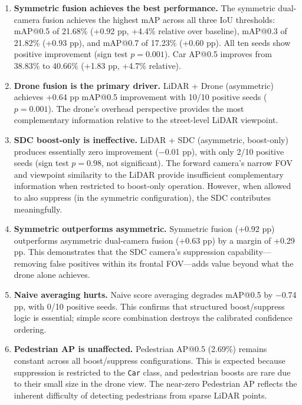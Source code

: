 \documentclass[sustainability,article,submit,moreauthors,pdftex]{Definitions/mdpi}
\begin{document}
\begin{enumerate}[leftmargin=*,labelsep=4.9mm]
\item \textbf{Symmetric fusion achieves the best performance.} The symmetric dual-camera fusion achieves the highest mAP across all three IoU thresholds: mAP@0.5 of 21.68\% (+0.92 pp, +4.4\% relative over baseline), mAP@0.3 of 21.82\% (+0.93 pp), and mAP@0.7 of 17.23\% (+0.60 pp). All ten seeds show positive improvement (sign test $p = 0.001$). Car AP@0.5 improves from 38.83\% to 40.66\% (+1.83 pp, +4.7\% relative).

\item \textbf{Drone fusion is the primary driver.} LiDAR + Drone (asymmetric) achieves +0.64 pp mAP@0.5 improvement with 10/10 positive seeds ($p = 0.001$). The drone's overhead perspective provides the most complementary information relative to the street-level LiDAR viewpoint.

\item \textbf{SDC boost-only is ineffective.} LiDAR + SDC (asymmetric, boost-only) produces essentially zero improvement ($-$0.01 pp), with only 2/10 positive seeds (sign test $p = 0.98$, not significant). The forward camera's narrow FOV and viewpoint similarity to the LiDAR provide insufficient complementary information when restricted to boost-only operation. However, when allowed to also suppress (in the symmetric configuration), the SDC contributes meaningfully.

\item \textbf{Symmetric outperforms asymmetric.} Symmetric fusion (+0.92 pp) outperforms asymmetric dual-camera fusion (+0.63 pp) by a margin of +0.29 pp. This demonstrates that the SDC camera's suppression capability---removing false positives within its frontal FOV---adds value beyond what the drone alone achieves.

\item \textbf{Naive averaging hurts.} Naive score averaging degrades mAP@0.5 by $-$0.74 pp, with 0/10 positive seeds. This confirms that structured boost/suppress logic is essential; simple score combination destroys the calibrated confidence ordering.

\item \textbf{Pedestrian AP is unaffected.} Pedestrian AP@0.5 (2.69\%) remains constant across all boost/suppress configurations. This is expected because suppression is restricted to the \texttt{Car} class, and pedestrian boosts are rare due to their small size in the drone view. The near-zero Pedestrian AP reflects the inherent difficulty of detecting pedestrians from sparse LiDAR points.
\end{enumerate}
\end{document}
